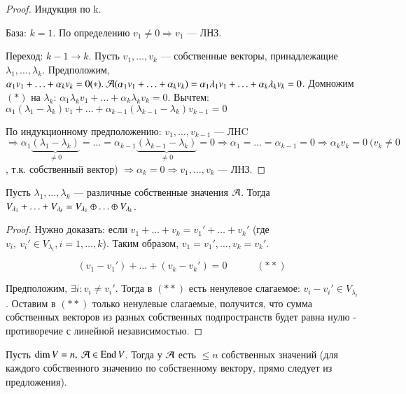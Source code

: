 \documentclass[main]{subfiles}
\begin{document}
\begin{proof}
    Индукция по k.

    База: $k = 1$.  По определению $v_1 \neq 0 \Rightarrow v_1$ — ЛНЗ.

    Переход: $k-1 \rightarrow k$. Пусть $v_1, \ldots, v_k$  — собственные
    векторы, принадлежащие $\lambda_1, \ldots, \lambda_k$.
    Предположим, $\alpha_1 v_1 + \ldots + \alpha_k v_k = 0 (*).\
        \mathcal{A}(\alpha_1 v_1 + \ldots + \alpha_k v_k) =
        \alpha_1 \lambda_1 v_1 + \ldots + \alpha_k \lambda_k v_k = 0$.  Домножим $(*)$ на $\lambda_k$:
    $\alpha_1 \lambda_k v_1 + \ldots + \alpha_k \lambda_k v_k = 0$.
    Вычтем: $\alpha_1(\lambda_1 - \lambda_k)v_1 + \ldots + \alpha_{k-1}(\lambda_{k-1} - \lambda_k)v_{k-1} = 0$

    По индукционному предположению: $v_1, \ldots, v_{k-1}$ — ЛНC
    $\Rightarrow \alpha_1\underbrace{(\lambda_1 - \lambda_k)}_{\neq 0} = \ldots =
        \alpha_{k-1}\underbrace{(\lambda_{k-1} - \lambda_k)}_{\neq 0} = 0 \Rightarrow
        \alpha_1 = \ldots = \alpha_{k-1} = 0 \Rightarrow \alpha_k v_k = 0\ (v_k \neq 0$, т.к. собственный вектор) $\Rightarrow \alpha_k = 0 \Rightarrow
        v_1, \ldots, v_k$ — ЛНЗ.
\end{proof}

\begin{corollary}
    Пусть $\lambda_1, \ldots, \lambda_k$ — различные собственные значения $\mathcal{A}$.
    Тогда   $V_{\lambda_1} + \ldots + V_{\lambda_k} =
        V_{\lambda_1} \oplus \ldots \oplus  V_{\lambda_k}$.
\end{corollary}

\begin{proof}
    Нужно доказать: если $v_1 + \ldots + v_k = v_1' + \ldots + v_k'$
    (где $v_i,\ v_i' \in V_{\lambda_i}, i = 1, \ldots, k$).
    Таким образом, $v_1 = v_1', \ldots, v_k = v_k'$.

    \[(v_1 - v_1') + \ldots + (v_k - v_k') = 0 \quad \quad \quad (**)\]

    Предположим, $\exists i : v_i \neq v_i'$. Тогда в $(**)$  есть ненулевое слагаемое:
    $v_i - v_i' \in V_{\lambda_i}$. Оставим в $(**)$ только ненулевые
    слагаемые, получится, что сумма собственных векторов из разных собственных подпространств будет равна нулю - противоречие с линейной независимостью.
\end{proof}

\begin{corollary}
    Пусть $\dim V = n,\ \mathcal{A} \in \operatorname{End} V$. Тогда у  $\mathcal{A}$ есть $\le n$ собственных значений (для каждого собственного значению по собственному вектору, прямо следует из предложения).
\end{corollary}
\end{document}
